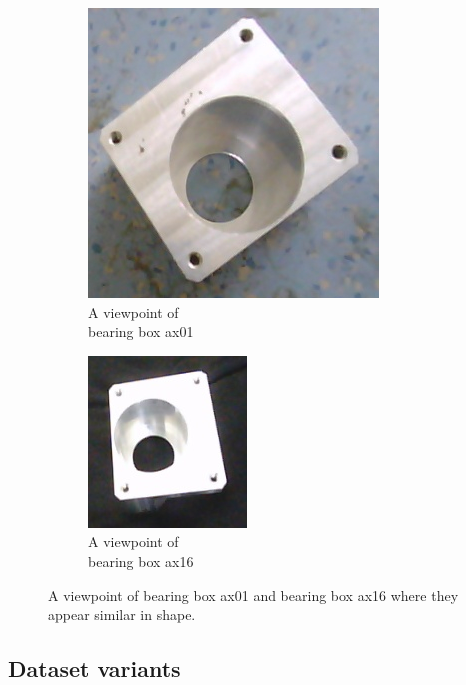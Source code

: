 \begin{itemize}
\begin{figure}[h]
	\centering
	\begin{subfigure}{.3\textwidth}
  		\centering
  		\includegraphics[width=.5\linewidth]{images/ax01_similar}
  		\caption{A viewpoint of \\bearing box ax01}
  		\label{Fig:sim2a}
	\end{subfigure}%
	\begin{subfigure}{.3\textwidth}
  		\centering
  		\includegraphics[width=.5\linewidth]{images/ax16_similar}
  		\caption{A viewpoint of \\bearing box ax16}
  		\label{Fig:sim2b}
	\end{subfigure}%
	\caption{A viewpoint of bearing box ax01 and bearing box ax16 where they appear similar in shape.}
	\label{Fig:sim2}
\end{figure}	
	\end{itemize}
	
	\subsection{Dataset variants}
	
